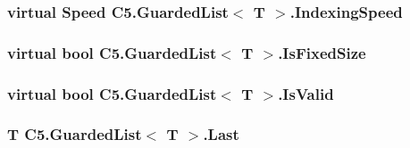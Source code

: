 \subsubsection[{Indexing\+Speed}]{\setlength{\rightskip}{0pt plus 5cm}virtual {\bf Speed} {\bf C5.\+Guarded\+List}$<$ T $>$.Indexing\+Speed\hspace{0.3cm}{\ttfamily [get]}}\label{class_c5_1_1_guarded_list_a153a69e81c48e5a2905fceb726aebc9e}




\hypertarget{class_c5_1_1_guarded_list_acbe8502e77878bf3c50eacd4879e5909}{}
\subsubsection[{Is\+Fixed\+Size}]{\setlength{\rightskip}{0pt plus 5cm}virtual bool {\bf C5.\+Guarded\+List}$<$ T $>$.Is\+Fixed\+Size\hspace{0.3cm}{\ttfamily [get]}}\label{class_c5_1_1_guarded_list_acbe8502e77878bf3c50eacd4879e5909}




\hypertarget{class_c5_1_1_guarded_list_a9f6857e8494abd309c9b4f4f92e5ab09}{}
\subsubsection[{Is\+Valid}]{\setlength{\rightskip}{0pt plus 5cm}virtual bool {\bf C5.\+Guarded\+List}$<$ T $>$.Is\+Valid\hspace{0.3cm}{\ttfamily [get]}}\label{class_c5_1_1_guarded_list_a9f6857e8494abd309c9b4f4f92e5ab09}




\hypertarget{class_c5_1_1_guarded_list_a349b68d991e7be0f5c46e9f0d6031fb8}{}
\subsubsection[{Last}]{\setlength{\rightskip}{0pt plus 5cm}T {\bf C5.\+Guarded\+List}$<$ T $>$.Last\hspace{0.3cm}{\ttfamily [get]}}\label{class_c5_1_1_guarded_list_a349b68d991e7be0f5c46e9f0d6031fb8}




